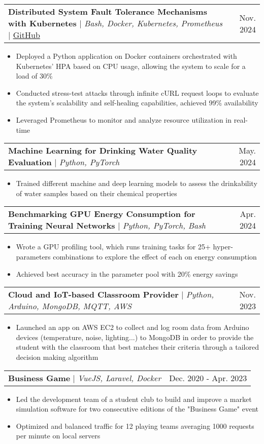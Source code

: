 \documentclass[letterpaper,10.5t]{article}
\makeatletter
\newcommand{\resumeItem}[1]{
  \item\small{
    {#1 \vspace{-2pt}}
  }
}
\newcommand{\resumeProjectHeading}[2]{
    \item
    \begin{tabular*}{0.97\textwidth}{l@{\extracolsep{\fill}}r}
      \small#1 & #2 \\
    \end{tabular*}\vspace{-7pt}
}
\newcommand{\resumeItemListStart}{\begin{itemize}}
\newcommand{\resumeItemListEnd}{\end{itemize}\vspace{-5pt}}
\makeatother
\begin{document}
        \resumeProjectHeading
        {\textbf{Distributed System Fault Tolerance Mechanisms with Kubernetes} $|$ \emph{Bash, Docker, Kubernetes, Prometheus} $|$ \href{https://github.com/Somnef/kubernetes-fault-tolerance}{\underline{GitHub}}}{Nov. 2024}
            \resumeItemListStart
                \resumeItem{Deployed a Python application on Docker containers orchestrated with Kubernetes' HPA based on CPU usage, allowing the system to scale for a load of 30\%}
                \resumeItem{Conducted stress-test attacks through infinite cURL request loops to evaluate the system's scalability and self-healing capabilities, achieved 99\% availability}
                \resumeItem{Leveraged Prometheus to monitor and analyze resource utilization in real-time}
            \resumeItemListEnd

        \resumeProjectHeading
        {\textbf{Machine Learning for Drinking Water Quality Evaluation} $|$ \emph{Python, PyTorch}}{May. 2024}
            \resumeItemListStart
                \resumeItem{Trained different machine and deep learning models to assess the drinkability of water samples based on their chemical properties }
            \resumeItemListEnd

        \resumeProjectHeading
        {\textbf{Benchmarking GPU Energy Consumption for Training Neural Networks} $|$ \emph{Python, PyTorch, Bash}}{Apr. 2024}
            \resumeItemListStart
                \resumeItem{Wrote a GPU profiling tool, which runs training tasks for 25+ hyper-parameters combinations to explore the effect of each on energy consumption}
                \resumeItem{Achieved best accuracy in the parameter pool with 20\% energy savings}
            \resumeItemListEnd

        \resumeProjectHeading
        {\textbf{Cloud and IoT-based Classroom Provider} $|$ \emph{Python, Arduino, MongoDB, MQTT, AWS}}{Nov. 2023}
            \resumeItemListStart
                \resumeItem{Launched an app on AWS EC2 to collect and log room data from Arduino devices (temperature, noise, lighting...) to MongoDB in order to provide the student with the classroom that best matches their criteria through a tailored decision making algorithm }
            \resumeItemListEnd

        \resumeProjectHeading
        {\textbf{Business Game} $|$ \emph{VueJS, Laravel, Docker}}{Dec. 2020 - Apr. 2023}
            \resumeItemListStart
                \resumeItem{Led the development team of a student club to build and improve a market simulation software for two consecutive editions of the "Business Game" event}
                \resumeItem{Optimized and balanced traffic for 12 playing teams averaging 1000 requests per minute on local servers}
            \resumeItemListEnd
          
\end{document}
